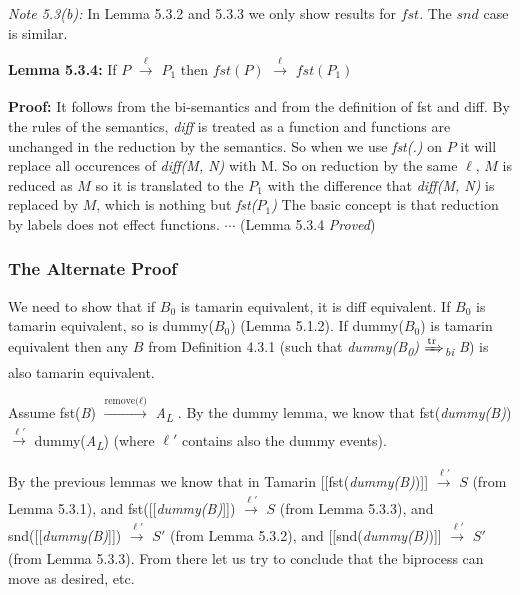 \documentclass[11pt]{article}
\begin{document}
{\it Note 5.3(b): }In Lemma 5.3.2 and 5.3.3 we only show results for $fst$. The $snd$ case is similar.\newline 

{\bf Lemma 5.3.4: }If $P$ {$\xrightarrow[\text{}]{\text{$\ell$}}$} $P_1$ then $fst(P)$ {$\xrightarrow[\text{}]{\text{$\ell$}}$} $fst(P_1)$ \newline

{\bf Proof:} It follows from the bi-semantics and from the definition of fst and diff. By the rules of the semantics, {\it diff} is treated as a function and functions are unchanged in the reduction by the semantics. So when we use {\it fst(.)} on $P$ it will replace all occurences of {\it diff(M, N)} with M. So on reduction by the same $\ell$, $M$ is reduced as $M$ so it is translated to the $P_1$ with the difference that {\it diff(M, N)} is replaced by $M$, which is nothing but {\it fst($P_1$)} The basic concept is that reduction by labels does not effect functions.   \hfill \hfill $\cdots$ (Lemma 5.3.4 {\it Proved})\newline 

\subsubsection{The Alternate Proof}
We need to show that if $B_0$ is tamarin equivalent, it is diff equivalent. If $B_0$ is tamarin equivalent, so is dummy($B_0$) (Lemma 5.1.2). If dummy($B_0$) is tamarin equivalent then any $B$ from Definition 4.3.1 (such that {\it dummy(B\textsubscript{0}) {$\xRightarrow[\text{}]{\text{tr}}$}\textsubscript{bi} B}) is also tamarin equivalent. 

Assume fst({\it B}) {$\xrightarrow[\text{}]{\text{remove($\ell$)}}$} {\it A}\textsubscript{{\it L}} . By the dummy lemma, we know that fst({\it dummy(B)}) {$\xrightarrow[\text{}]{\text{$\ell'$}}$} dummy({\it A}\textsubscript{{\it L}}) (where $\ell'$ contains also the dummy events). 

By the previous lemmas we know that in Tamarin [[fst({\it dummy(B)})]] {$\xrightarrow[\text{}]{\text{$\ell'$}}$} $S$ (from Lemma 5.3.1), and fst([[{\it dummy(B)}]]) {$\xrightarrow[\text{}]{\text{$\ell'$}}$} $S$ (from Lemma 5.3.3), and snd([[{\it dummy(B)}]]) {$\xrightarrow[\text{}]{\text{$\ell'$}}$} $S'$ (from Lemma 5.3.2), and [[snd({\it dummy(B)})]] {$\xrightarrow[\text{}]{\text{$\ell'$}}$} $S'$ (from Lemma 5.3.3). From there let us try to conclude that the biprocess can move as desired, etc.\newline
\end{document}
